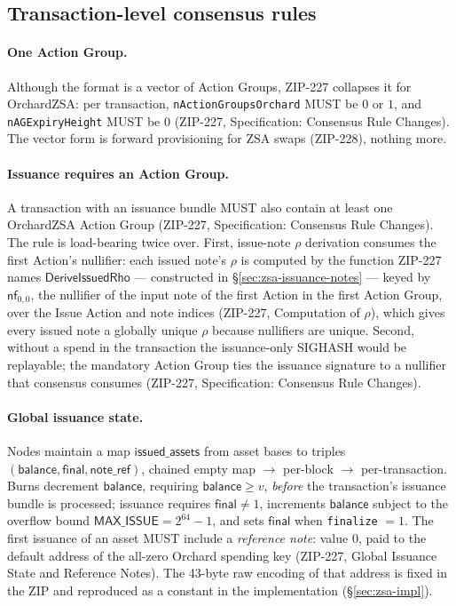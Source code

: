 \documentclass[11pt,a4paper]{article}
\theoremstyle{definition}
\newcommand{\nfsym}{\mathsf{nf}}
\begin{document}
\subsection{Transaction-level consensus rules}\label{sec:zsa-tx-rules}

\paragraph{One Action Group.} Although the format is a vector of Action
Groups, ZIP-227 collapses it for OrchardZSA: per transaction,
\texttt{nActionGroupsOrchard} MUST be $0$ or $1$, and
\texttt{nAGExpiryHeight} MUST be $0$ (ZIP-227, Specification: Consensus Rule
Changes). The vector form is forward provisioning for ZSA swaps (ZIP-228),
nothing more.

\paragraph{Issuance requires an Action Group.} A transaction with an
issuance bundle MUST also contain at least one OrchardZSA Action Group
(ZIP-227, Specification: Consensus Rule Changes). The rule is load-bearing
twice over. First, issue-note $\rho$ derivation consumes the first Action's
nullifier: each issued note's $\rho$ is computed by the function ZIP-227
names $\mathsf{DeriveIssuedRho}$ --- constructed in
\S\ref{sec:zsa-issuance-notes} --- keyed by $\nfsym_{0,0}$, the nullifier
of the input note of the first Action in the first Action Group, over the
Issue Action and note indices (ZIP-227, Computation of $\rho$), which
gives every issued note a globally unique $\rho$ because nullifiers are
unique.
Second, without a spend in the transaction the issuance-only SIGHASH would
be replayable; the mandatory Action Group ties the issuance signature to a
nullifier that consensus consumes (ZIP-227, Specification: Consensus Rule
Changes).

\paragraph{Global issuance state.} Nodes maintain a map
$\mathsf{issued\_assets}$ from asset bases to triples
$(\mathsf{balance}, \mathsf{final}, \mathsf{note\_ref})$, chained empty map
$\rightarrow$ per-block $\rightarrow$ per-transaction. Burns decrement
$\mathsf{balance}$, requiring $\mathsf{balance} \geq v$, \emph{before} the
transaction's issuance bundle is processed; issuance requires
$\mathsf{final} \neq 1$, increments $\mathsf{balance}$ subject to the
overflow bound $\mathsf{MAX\_ISSUE} = 2^{64} - 1$, and sets
$\mathsf{final}$ when \texttt{finalize} $= 1$. The first issuance of an
asset MUST include a \emph{reference note}: value $0$, paid to the default
address of the all-zero Orchard spending key (ZIP-227, Global Issuance State
and Reference Notes). The 43-byte raw encoding of that address is fixed in
the ZIP and reproduced as a constant in the implementation
(\S\ref{sec:zsa-impl}).
\end{document}
